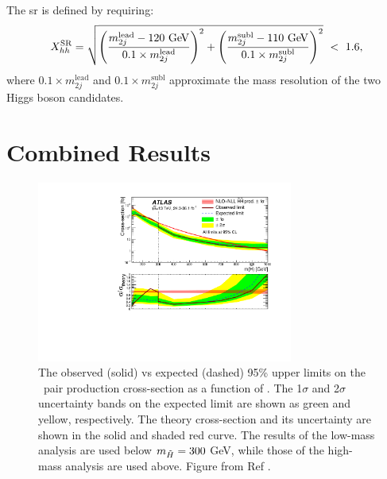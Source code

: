 The \gls{sr} is defined by requiring: 
\begin{equation}
X_{hh}^\textrm{SR} = \sqrt{ \left( \frac{m_{2j}^\textrm{lead} - 120\ \text{Ge\kern -0.1em V}}{0.1\times m_{2j}^\textrm{lead}} \right)^2 + \left( \frac{m_{2j}^\textrm{subl} - 110\ \text{Ge\kern -0.1em V}}{0.1\times m_{2j}^\textrm{subl}} \right)^2} \ <\ 1.6,
\end{equation}
\noindent where $0.1 \times m_{2j}^\textrm{lead}$ and $0.1 \times m_{2j}^\textrm{subl}$ approximate the mass resolution of the two Higgs 
boson candidates. 


\section{Combined Results}

\begin{figure}[htbp]
	\centering
\includegraphics[width=0.75\textwidth]{figures/ewk_prod/interpretation/GGMupperLimit_unblinded_jump}
	\caption{The observed (solid) vs expected (dashed) 95\% upper limits on the \hino\ pair production cross-section as a function of \mhino.  The 1$\sigma$ and 2$\sigma$ uncertainty bands on the expected limit are shown as green and yellow, respectively. The theory cross-section and its uncertainty are shown in the solid and shaded red curve.
   The results of the low-mass analysis are used below $m_{\tilde{H}} = 300$ GeV, while those of the high-mass analysis are used above. 
   Figure from Ref \cite{Aaboud:2018htj}. } 
	\label{fig:exclusion}
\end{figure}


